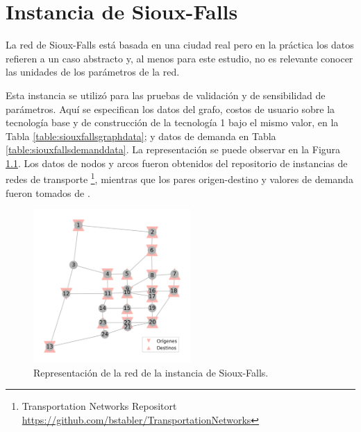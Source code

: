 \chapter{Instancia de Sioux-Falls}
\label{sect:siouxfallsdata}

La red de Sioux-Falls está basada en una ciudad real pero en la práctica los datos refieren a un caso abstracto y, al menos para este estudio, no es relevante conocer las unidades de los parámetros de la red.

Esta instancia se utilizó para las pruebas de validación y de sensibilidad de parámetros. Aquí se especifican los datos del grafo, costos de usuario sobre la tecnología base y de construcción de la tecnología 1 bajo el mismo valor, en la Tabla \ref{table:siouxfallsgraphdata}; y datos de demanda en Tabla \ref{table:siouxfallsdemanddata}. La representación se puede observar en la Figura \ref{fig:siouxfallsapendix}. Los datos de nodos y arcos fueron obtenidos del repositorio de instancias de redes de transporte \footnote{Transportation Networks Repositort \url{https://github.com/bstabler/TransportationNetworks}}, mientras que los pares origen-destino y valores de demanda fueron tomados de \textcite{Liu2019}.

\begin{figure}[h!]
\centering
\includegraphics[width=6cm]{../resources/sioux_falls_odpairs.png}
\caption{Representación de la red de la instancia de Sioux-Falls.}
\label{fig:siouxfallsapendix}
\end{figure}

